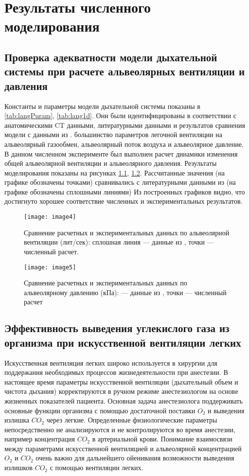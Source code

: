 \chapter{Результаты численного моделирования}

\section{Проверка адекватности модели дыхательной системы при расчете альвеолярных вентиляции и давления}
Константы и параметры модели дыхательной системы показаны в \ref{tab:langPuram}, \ref{tab:lang1d}. 
Они были идентифицированы в соответствии с анатомическими CT данными, литературными данными \cite{bental2013,Simakov2009,Mead1961} и результатов сравнения модели с данными из \cite{schmidt}.  большинство параметров легочной вентиляции на альвеолярный газообмен, альвеолярный поток воздуха и альвеолярное давление. В данном численном эксперименте был выполнен расчет динамики изменения общей альвеолярной вентиляции и альвеолярного давления. Результаты моделирования показаны на рисунках \ref{image4}, \ref{image5}. Рассчитанные значения (на графике обозначены точками) сравнивались с литературными данными из \cite{schmidt} (на графике обозначены сплошными линиями)  Из построенных графиков видно, что достигнуто хорошее соответствие численных и экспериментальных результатов.

\begin{figure}[!ht]
	\centering
	\texttt{[image: image4]}
	\caption{Сравнение расчетных и экспериментальных данных по альвеолярной вентиляции (лит/сек): сплошная линия --- данные из \cite{schmidt}, точки --- численный расчет.} 
	\label{image4}	
\end{figure}

\begin{figure}[!ht]
	\centering
	\texttt{[image: image5]}
	\caption{Сравнение расчетных и экспериментальных данных по альвеолярному давлению (кПа): --- данные из \cite{schmidt}, точки --- численный расчет} 
	\label{image5}
\end{figure}


\section{ Эффективность выведения углекислого газа из организма при искусственной вентиляции легких}

Искусственная вентиляция легких широко используется в хирургии для поддержания необходимых процессов жизнедеятельности при анестезии. В настоящее время параметры искусственной вентиляции (дыхательный объем и чистота дыхания) корректируются в ручном режиме анестезиологом на основе жизненных показателей пациента.  Основная задача анестезиолога поддерживать основные функции организма с помощью достаточной поставки $O_{2} $ и выведения излишка $CO_{2} $ через легкие. Определенные физиологические параметры непосредственно не анализируются и не контролируются во время анестезии, например концентрация $CO_{2} $ в артериальной крови. Понимание взаимосвязи между параметрами искусственной вентиляцией и альвеолярной концентрацией $O_{2} $ и $CO_{2} $ очень важно для дальнейшего ойенивания возможности выведения излишков $CO_{2} $ с помощью вентиляции легких. 

